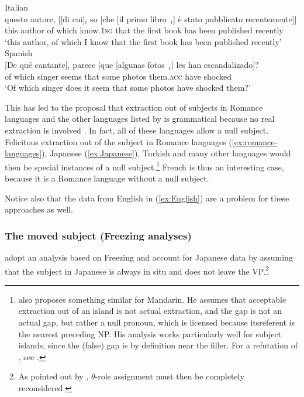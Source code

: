 \eal \label{ex:romance-languages}
\ex Italian \citep[61]{Rizzi.1982}\\ 
\gll questo autore, [[di cui]$_i$ so [che [il primo libro~\trace{}$_i$] è stato pubblicato recentemente]]\\ 
this author \ssbar{}of which know.\textsc{1sg} \sbar{}that \sbar{}the first book has been published recently\\ 
\glt `this author, of which I know that the first book has been published recently'
\label{ex:rizzi-it}
\ex Spanish \citep[103]{Jimenez-Fernandez.2009}\\
\gll \textquestiondown{}[De qué cantante]$_i$ parece [que [algunas fotos~\trace{}$_i$] les han escandalizado]?\\
\ssbar{}of which singer seems \sbar{}that \sbar{}some photos them\textsc{.acc} have shocked\\
\glt `Of which singer does it seem that some photos have shocked them?'
\label{ex:spanish-preverbal-subject-good}
\zl 

This has led to the proposal that extraction out of subjects in Romance languages and the other languages listed by \citet{Stepanov.2007} is grammatical because no real extraction is involved \citep{Rizzi.1990,Uriagereka.2012}. In fact, all of these languages allow a null subject. Felicitous extraction out of the subject in Romance languages (\ref{ex:romance-languages}), Japanese (\ref{ex:Japanese}), Turkish and many other languages would then be special instances of a null subject.\footnote{\citet{Huang.1984} also proposes something similar for Mandarin. He assumes that acceptable extraction out of an island is not actual extraction, and the gap is not an actual gap, but rather a null pronoun, which is licensed because itsreferent is the nearest preceding NP. His analysis works particularly well for subject islands, since the (false) gap is by definition near the filler. For a refutation of \citet{Huang.1984}, see \citet[2--3]{Dong.2021}.} French is thus an interesting case, because it is a Romance language without a null subject.

Notice also that the data from English in (\ref{ex:English}) are a problem for these approaches as well. 

\subsubsection{The moved subject (Freezing analyses)}

\citet{Lasnik.1992} adopt an analysis based on Freezing and account for Japanese data by assuming that the subject in Japanese is always in situ and does not leave the VP.\footnote{As pointed out by \citet{Stepanov.2007}, $\theta$-role assignment must then be completely reconsidered.} 

